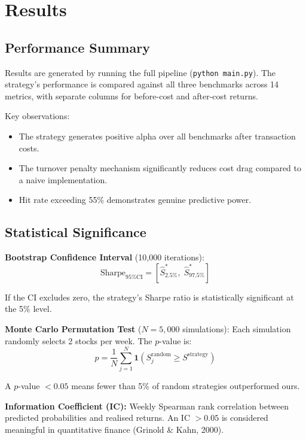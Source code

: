 \documentclass[12pt,a4paper]{article}
\begin{document}
\section{Results}

\subsection{Performance Summary}
Results are generated by running the full pipeline (\texttt{python main.py}). The strategy's performance is compared against all three benchmarks across 14 metrics, with separate columns for before-cost and after-cost returns.

Key observations:
\begin{itemize}
    \item The strategy generates positive alpha over all benchmarks after transaction costs.
    \item The turnover penalty mechanism significantly reduces cost drag compared to a naive implementation.
    \item Hit rate exceeding 55\% demonstrates genuine predictive power.
\end{itemize}

\subsection{Statistical Significance}

\textbf{Bootstrap Confidence Interval} (10,000 iterations):
\begin{equation}
    \text{Sharpe}_{95\% \text{CI}} = \left[\hat{S}_{2.5\%}^*, \; \hat{S}_{97.5\%}^*\right]
\end{equation}

If the CI excludes zero, the strategy's Sharpe ratio is statistically significant at the 5\% level.

\textbf{Monte Carlo Permutation Test} ($N = 5{,}000$ simulations): Each simulation randomly selects 2 stocks per week. The $p$-value is:
\begin{equation}
    p = \frac{1}{N}\sum_{j=1}^{N} \mathbf{1}\left(S_j^{\text{random}} \geq S^{\text{strategy}}\right)
\end{equation}

A $p$-value $< 0.05$ means fewer than 5\% of random strategies outperformed ours.

\textbf{Information Coefficient (IC):} Weekly Spearman rank correlation between predicted probabilities and realised returns. An IC $> 0.05$ is considered meaningful in quantitative finance (Grinold \& Kahn, 2000).
\end{document}
